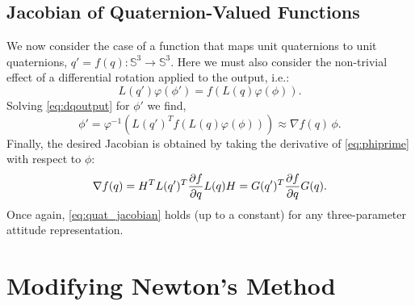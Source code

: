 \documentclass[letterpaper, 10 pt, conference]{ieeeconf}  %
\newcommand{\Q}{\mathbb{S}^3}
\newcommand{\todo}[1]{\textcolor{red}{TODO: #1}}
\begin{document}
    \subsection{Jacobian of Quaternion-Valued Functions}
        We now consider the case of a function that maps unit quaternions to unit
        quaternions, $q' = f(q) : \Q \to \Q$. 
        Here we must also consider the non-trivial
        effect of a differential rotation applied to the output, i.e.:
        \begin{equation} \label{eq:dqoutput}
            L(q') \varphi(\phi') = f(L(q)\varphi(\phi)) .
        \end{equation}
        Solving \eqref{eq:dqoutput} for $\phi'$ we find,
        \begin{equation} \label{eq:phiprime}
            \phi' = \varphi^{-1} \left( L(q')^T f(L(q)\varphi(\phi)) \right) \approx \nabla f(q) \, \phi.
        \end{equation}
        Finally, the desired Jacobian is obtained by taking the derivative of
        \eqref{eq:phiprime} with respect to $\phi$:
        \begin{equation} \label{eq:quat_jacobian}
            \nabla f(q) = H^T L(q')^T \pdv{f}{q} L(q) H = G(q')^T \pdv{f}{q} G(q).
        \end{equation}
        Once again, \eqref{eq:quat_jacobian} holds (up to a constant) for any
        three-parameter attitude representation.
        


\section{Modifying Newton's Method} \label{sec:Wahbas}

\end{document}
